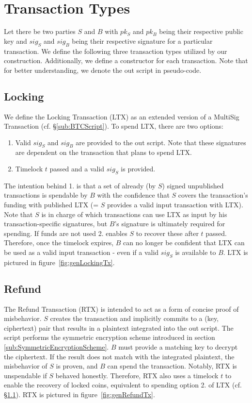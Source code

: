 \documentclass{cacthesis}
\begin{document}
	   \section{Transaction Types}
	   \label{sec:OurTransactionTypes}
        Let there be two parties $S$ and $B$ with $pk_S$ and $pk_B$  being their respective public key and $sig_S$ and $sig_B$ being their respective signature for a particular transaction. We define the following three transaction types utilized by our construction. Additionally, we define a constructor for each transaction. Note that for better understanding, we denote the out script in pseudo-code.
        
        \subsection{Locking}
        \label{sub:LockingTx}
        We define the Locking Transaction (LTX) as an extended version of a MultiSig Transaction (cf. §\ref{sub:BTCScript}). To spend LTX, there are two options:
        \begin{enumerate}
	        \item Valid $sig_S$ and $sig_B$ are provided to the out script. Note that these signatures are dependent on the transaction that plans to spend LTX.
	        \item Timelock $t$ passed and a valid $sig_S$ is provided.
        \end{enumerate}
        The intention behind 1. is that a set of already (by $S$) signed unpublished transactions is spendable by $B$ with the confidence that $S$ covers the transaction's funding with published LTX (= $S$ provides a valid input transaction with LTX). Note that $S$ is in charge of which transactions can use LTX as input by his transaction-specific signatures, but $B$'s signature is ultimately required for spending.
        If funds are not used 2. enables $S$ to recover these after $t$ passed. Therefore, once the timelock expires, $B$ can no longer be confident that LTX can be used as a valid input transaction - even if a valid $sig_S$ is available to $B$. LTX is pictured in \mbox{figure \ref{fig:genLockingTx}}.
        
        \subsection{Refund}
        \label{sub:RefundTx}
        The Refund Transaction (RTX) is intended to act as a form of concise proof of misbehavior. $S$ creates the transaction and implicitly commits to a (key, ciphertext) pair that results in a plaintext integrated into the out script. The script performs the symmetric encryption scheme introduced in section \ref{sub:SymmetricEncryptionScheme}. $B$ must provide a matching key to decrypt the ciphertext. If the result does not match with the integrated plaintext, the misbehavior of $S$ is proven, and $B$ can spend the transaction. Notably, RTX is unspendable if $S$ behaved honestly. Therefore, RTX also uses a timelock $t$ to enable the recovery of locked coins, equivalent to spending option 2. of LTX (cf. §\ref{sub:LockingTx}). RTX is pictured in \mbox{figure \ref{fig:genRefundTx}}.   
        
\end{document}
